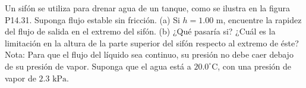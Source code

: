 \item Un sifón se utiliza para drenar agua de un tanque, como se ilustra en la figura P14.31. Suponga flujo estable sin fricción. (a) Si $h = 1.00 \text{ m}$, encuentre la rapidez del flujo de salida en el extremo del sifón. (b) ¿Qué pasaría si? ¿Cuál es la limitación en la altura de la parte superior del sifón respecto al extremo de éste? Nota: Para que el flujo del líquido sea continuo, su presión no debe caer debajo de su presión de vapor. Suponga que el agua está a $20.0^\circ\text{C}$, con una presión de vapor de $2.3 \text{ kPa}$.
